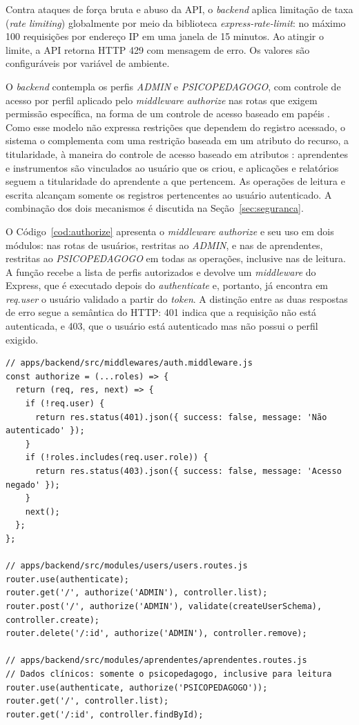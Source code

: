 Contra ataques de força bruta e abuso da API, o \textit{backend} aplica limitação de taxa (\textit{rate limiting}) globalmente por meio da biblioteca \textit{express-rate-limit}: no máximo 100 requisições por endereço IP em uma janela de 15 minutos. Ao atingir o limite, a API retorna HTTP 429 com mensagem de erro. Os valores são configuráveis por variável de ambiente.

O \textit{backend} contempla os perfis \textit{ADMIN} e \textit{PSICOPEDAGOGO}, com controle de acesso por perfil aplicado pelo \textit{middleware} \textit{authorize} nas rotas que exigem permissão específica, na forma de um controle de acesso baseado em papéis \cite{sandhu1996_rbac}. Como esse modelo não expressa restrições que dependem do registro acessado, o sistema o complementa com uma restrição baseada em um atributo do recurso, a titularidade, à maneira do controle de acesso baseado em atributos \cite{hu2014_abac}: aprendentes e instrumentos são vinculados ao usuário que os criou, e aplicações e relatórios seguem a titularidade do aprendente a que pertencem. As operações de leitura e escrita alcançam somente os registros pertencentes ao usuário autenticado. A combinação dos dois mecanismos é discutida na Seção~\ref{sec:seguranca}.

O Código~\ref{cod:authorize} apresenta o \textit{middleware} \textit{authorize} e seu uso em dois módulos: nas rotas de usuários, restritas ao \textit{ADMIN}, e nas de aprendentes, restritas ao \textit{PSICOPEDAGOGO} em todas as operações, inclusive nas de leitura. A função recebe a lista de perfis autorizados e devolve um \textit{middleware} do Express, que é executado depois do \textit{authenticate} e, portanto, já encontra em \textit{req.user} o usuário validado a partir do \textit{token}. A distinção entre as duas respostas de erro segue a semântica do HTTP: 401 indica que a requisição não está autenticada, e 403, que o usuário está autenticado mas não possui o perfil exigido.

\begin{lstlisting}[caption={Middleware \textit{authorize} e sua aplicação nas rotas de usuários e de aprendentes},label={cod:authorize}]
// apps/backend/src/middlewares/auth.middleware.js
const authorize = (...roles) => {
  return (req, res, next) => {
    if (!req.user) {
      return res.status(401).json({ success: false, message: 'Não autenticado' });
    }
    if (!roles.includes(req.user.role)) {
      return res.status(403).json({ success: false, message: 'Acesso negado' });
    }
    next();
  };
};

// apps/backend/src/modules/users/users.routes.js
router.use(authenticate);
router.get('/', authorize('ADMIN'), controller.list);
router.post('/', authorize('ADMIN'), validate(createUserSchema), controller.create);
router.delete('/:id', authorize('ADMIN'), controller.remove);

// apps/backend/src/modules/aprendentes/aprendentes.routes.js
// Dados clínicos: somente o psicopedagogo, inclusive para leitura
router.use(authenticate, authorize('PSICOPEDAGOGO'));
router.get('/', controller.list);
router.get('/:id', controller.findById);
\end{lstlisting}

